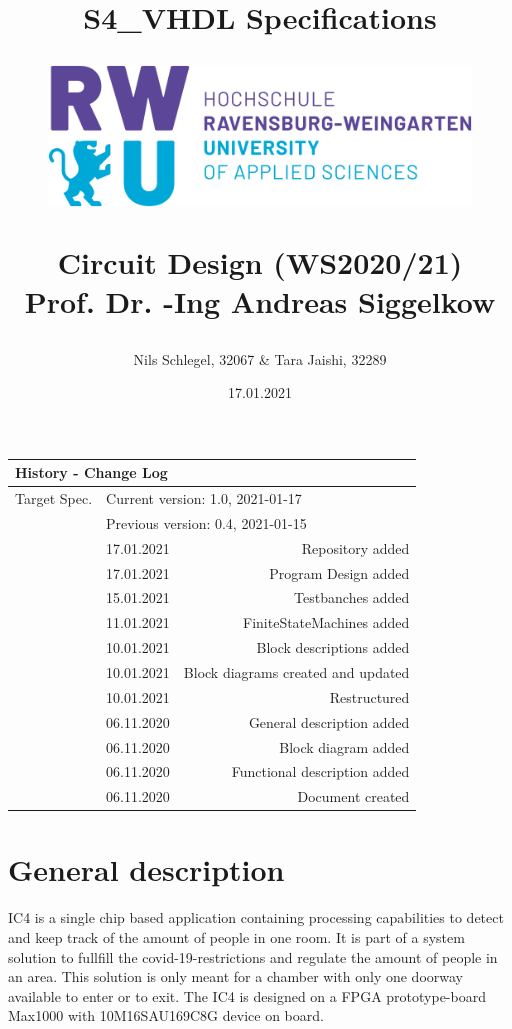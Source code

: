 \documentclass[12pt,a4 paper] {report}
\title{
	\textbf{S4\_VHDL Specifications} \\
	\begin{figure}[h]
		\centering
		\includegraphics[scale=0.4]{../png/rwu.png}
	\end{figure}
	Circuit Design (WS2020/21) \\
	Prof. Dr. -Ing Andreas Siggelkow \\
}
\author{Nils Schlegel, 32067 \& Tara Jaishi, 32289}
\date{17.01.2021}
\begin{document}
\maketitle

\newpage

\begin{center}
	\begin{tabular}{llr}
		\multicolumn{3}{l}{\textbf{History - Change Log}} \\
		\hline
		Target Spec. & \multicolumn{2}{l}{Current version: 1.0, 2021-01-17} \\
		& \multicolumn{2}{l}{Previous version: 0.4, 2021-01-15} \\
		\hline
		&	17.01.2021 & Repository added \\
		&	17.01.2021 & Program Design added \\
		&	15.01.2021 & Testbanches added \\
		&	11.01.2021 & FiniteStateMachines added \\
		&	10.01.2021 & Block descriptions added \\
		&	10.01.2021 & Block diagrams created and updated \\
		&	10.01.2021 & Restructured \\
		&	06.11.2020 & General description added \\
		&	06.11.2020 & Block diagram added \\
		&	06.11.2020 & Functional description added \\
		&	06.11.2020 & Document created
	\end{tabular}
\end{center}

\newpage

\tableofcontents

\newpage

\chapter{General description}
IC4 is a single chip based application containing processing capabilities to detect and keep track of the amount of people in one room. It is part of a system solution to fullfill the covid-19-restrictions and regulate the amount of people in an area. This solution is only meant for a chamber with only one doorway available to enter or to exit.\newline
The IC4 is designed on a FPGA prototype-board Max1000 with 10M16SAU169C8G device on board.

\newpage
\end{document}
